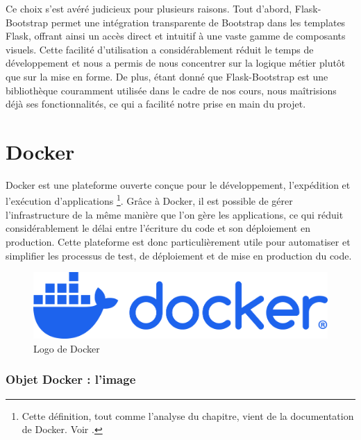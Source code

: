              Ce choix s'est avéré judicieux pour plusieurs raisons. Tout d'abord, Flask-Bootstrap permet une intégration transparente de Bootstrap dans les templates Flask, offrant ainsi un accès direct et intuitif à une vaste gamme de composants visuels. Cette facilité d'utilisation a considérablement réduit le temps de développement et nous a permis de nous concentrer sur la logique métier plutôt que sur la mise en forme. De plus, étant donné que Flask-Bootstrap est une bibliothèque couramment utilisée dans le cadre de nos cours, nous maîtrisions déjà ses fonctionnalités, ce qui a facilité notre prise en main du projet.

        \section{Docker}
        Docker est une plateforme ouverte conçue pour le développement, l'expédition et l'exécution d'applications \footnote{Cette définition, tout comme l'analyse du chapitre, vient de la documentation de Docker. Voir \cite{docker_overview}.}. Grâce à Docker, il est possible de gérer l'infrastructure de la même manière que l'on gère les applications, ce qui réduit considérablement le délai entre l'écriture du code et son déploiement en production. Cette plateforme est donc particulièrement utile pour automatiser et simplifier les processus de test, de déploiement et de mise en production du code.

        \begin{figure}[h!]
            \centering
            \includegraphics[width=12cm]{02_images/part_01/06_docker-logo-blue.png}
            \caption{Logo de Docker} %
        \end{figure}

        \subsubsection{Objet Docker : l'image}
        
